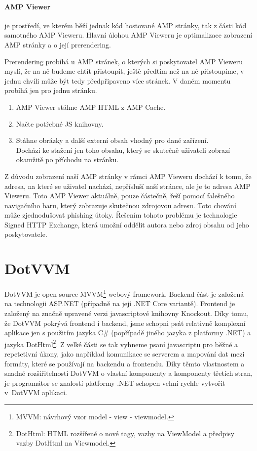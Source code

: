\subsubsection*{AMP Viewer}
 je prostředí, ve kterém běží jednak kód hostované AMP stránky, tak z části kód samotného AMP Vieweru. Hlavní úlohou AMP Vieweru je optimalizace zobrazení AMP stránky a o její prerendering.

Prerendering probíhá u AMP stránek, o kterých si poskytovatel AMP Vieweru myslí, že na ně budeme chtít přistoupit, ještě předtím než na ně přistoupíme, v jednu chvíli může být tedy předpřipaveno více stránek. V daném momentu probíhá jen pro jednu stránku. 
\begin{gatger}
\begin{enumerate}
    \item AMP Viewer stáhne AMP HTML z AMP Cache.
    \item Načte potřebné JS knihovny.
    \item Stáhne obrázky a další externí obsah vhodný pro dané zařízení. \\
    Dochází ke stažení jen toho obsahu, který se skutečně uživateli zobrazí okamžitě po příchodu na stránku\cite{ampConf}.
\end{enumerate}
\end{gatger}
Z důvodu zobrazení naší AMP stránky v rámci AMP Vieweru dochází k tomu, že adresa, na které se uživatel nachází, nepřísluší naší stránce, ale je to adresa AMP Vieweru. Toto AMP Viewer aktuálně, pouze částečně, řeší pomocí falešného navigačního baru, který zobrazuje skutečnou zdrojovou adresu. Toto chování může zjednodušovat phishing útoky\cite[Ch.\ 3, p.\ 50]{VzhuruDoAMP}.
Řešením tohoto problému je technologie Signed HTTP Exchange, která umožní oddělit autora nebo zdroj obsahu od jeho poskytovatele\cite[Ch.\ 3, p.\ 51]{VzhuruDoAMP}.
\chapter{DotVVM}
DotVVM je open source MVVM\footnote{MVVM: návrhový vzor model - view - viewmodel.} webový framework\cite{DotVVMIntro}. Backend část je založená na technologii ASP.NET (případně na její .NET Core variantě). Frontend je založený na značně upravené verzi javascriptové knihovny Knockout. Díky tomu, že DotVVM pokrývá frontend i backend, jsme schopni psát relativně komplexní aplikace jen s použitím jazyka C\# (popřípadě jiného jazyka z platformy .NET) a jazyka DotHtml\footnote{DotHtml: HTML rozšířené o nové tagy, vazby na ViewModel a předpisy vazby DotHtml na Viewmodel.}. Z velké části se tak vyhneme psaní javascriptu pro běžné a repetetivní úkony, jako například komunikace se serverem a mapování dat mezi formáty, které se používají na backendu a frontendu.
Díky těmto vlastnostem a snadné rozšiřitelnosti DotVVM o vlastní komponenty a komponenty třetích stran, je programátor se znalostí platformy .NET schopen velmi rychle vytvořit v~DotVVM aplikaci.


